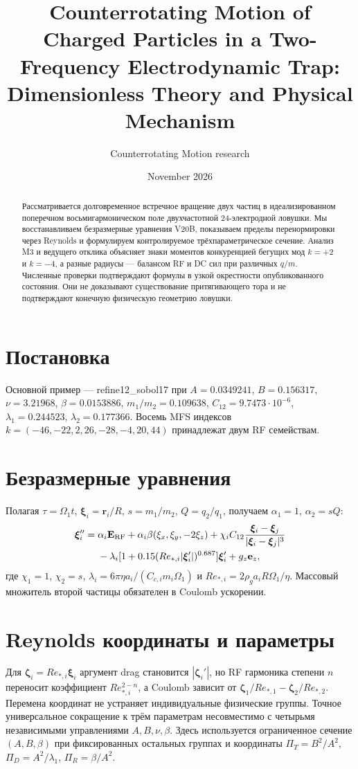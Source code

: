 \documentclass[11pt]{article}
\title{Counterrotating Motion of Charged Particles in a Two-Frequency Electrodynamic Trap: Dimensionless Theory and Physical Mechanism}
\author{Counterrotating Motion research}
\date{November 2026}
\begin{document}
\maketitle
\begin{abstract}
Рассматривается долговременное встречное вращение двух частиц в идеализированном поперечном восьмигармоническом поле двухчастотной 24-электродной ловушки. Мы восстанавливаем безразмерные уравнения V20B, показываем пределы перенормировки через Reynolds и формулируем контролируемое трёхпараметрическое сечение. Анализ M3 и ведущего отклика объясняет знаки моментов конкуренцией бегущих мод $k=+2$ и $k=-4$, а разные радиусы — балансом RF и DC сил при различных $q/m$. Численные проверки подтверждают формулы в узкой окрестности опубликованного состояния. Они не доказывают существование притягивающего тора и не подтверждают конечную физическую геометрию ловушки.
\end{abstract}
\section{Постановка}
Основной пример --- refine12\_sobol17 при $A=0.0349241$, $B=0.156317$, $\nu=3.21968$, $\beta=0.0153886$, $m_1/m_2=0.109638$, $C_{12}=9.7473\cdot10^{-6}$, $\lambda_1=0.244523$, $\lambda_2=0.177366$. Восемь MFS индексов $k=(-46,-22,2,26,-28,-4,20,44)$ принадлежат двум RF семействам.
\section{Безразмерные уравнения}
Полагая $\tau=\Omega_1t$, $\boldsymbol\xi_i=\mathbf r_i/R$, $s=m_1/m_2$, $Q=q_2/q_1$, получаем $\alpha_1=1$, $\alpha_2=sQ$:
\begin{align}
\boldsymbol\xi_i''={}&\alpha_i\mathbf E_{\rm RF}
+\alpha_i\beta(\xi_x,\xi_y,-2\xi_z)
+\chi_iC_{12}\frac{\boldsymbol\xi_i-\boldsymbol\xi_j}{|\boldsymbol\xi_i-\boldsymbol\xi_j|^3}\\
&-\lambda_i[1+0.15(Re_{*,i}|\boldsymbol\xi_i'|)^{0.687}]\boldsymbol\xi_i'+g_z\mathbf e_z,
\end{align}
где $\chi_1=1$, $\chi_2=s$, $\lambda_i=6\pi\eta a_i/(C_{c,i}m_i\Omega_1)$ и $Re_{*,i}=2\rho_ga_iR\Omega_1/\eta$. Массовый множитель второй частицы обязателен в Coulomb ускорении.
\section{Reynolds координаты и параметры}
Для $\boldsymbol\zeta_i=Re_{*,i}\boldsymbol\xi_i$ аргумент drag становится $|\boldsymbol\zeta_i'|$, но RF гармоника степени $n$ переносит коэффициент $Re_{*,i}^{2-n}$, а Coulomb зависит от $\boldsymbol\zeta_1/Re_{*,1}-\boldsymbol\zeta_2/Re_{*,2}$. Перемена координат не устраняет индивидуальные физические группы. Точное универсальное сокращение к трём параметрам несовместимо с четырьмя независимыми управлениями $A,B,\nu,\beta$. Здесь используется ограниченное сечение $(A,B,\beta)$ при фиксированных остальных группах и координаты $\Pi_T=B^2/A^2$, $\Pi_D=A^2/\lambda_1$, $\Pi_R=\beta/A^2$.
\end{document}
